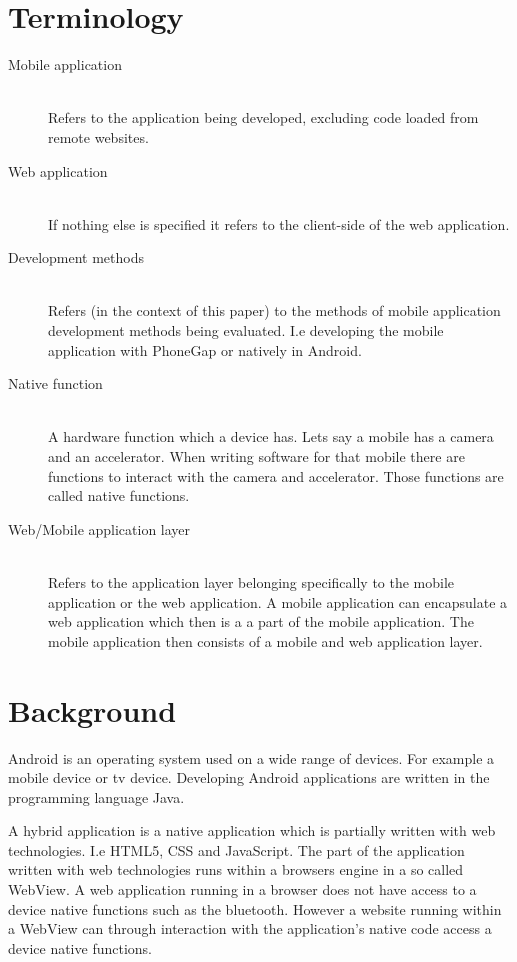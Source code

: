 \section{Terminology}
\begin{description}
  \item[Mobile application] \hfill \\
    Refers to the application being developed, excluding code loaded from remote websites.
  \item[Web application] \hfill \\
    If nothing else is specified it refers to the client-side of the web application.
  \item[Development methods] \hfill \\
    Refers (in the context of this paper) to the methods of mobile application development methods being evaluated. I.e developing the mobile application with PhoneGap or natively in Android.
  \item[Native function] \hfill \\
     A hardware function which a device has. Lets say a mobile has a camera and an accelerator. When writing software for that mobile there are functions to interact with the camera and accelerator. Those functions are called native functions.
  \item[Web/Mobile application layer] \hfill \\
	Refers to the application layer belonging specifically to the mobile application or the web application. A mobile application can encapsulate a web application which then is a a part of the mobile application. The mobile application then consists of a mobile and web application layer.
\end{description}

\section{Background}\label{section-background}
Android is an operating system used on a wide range of devices. For example a mobile device or tv device. Developing Android applications are written in the programming language Java. 

A hybrid application is a native application which is partially written with web technologies. I.e HTML5, CSS and JavaScript. The part of the application written with web technologies runs within a browsers engine in a so called WebView. A web application running in a browser does not have access to a device native functions such as the bluetooth. However a website running within a WebView can through interaction with the application's native code access a device native functions.


